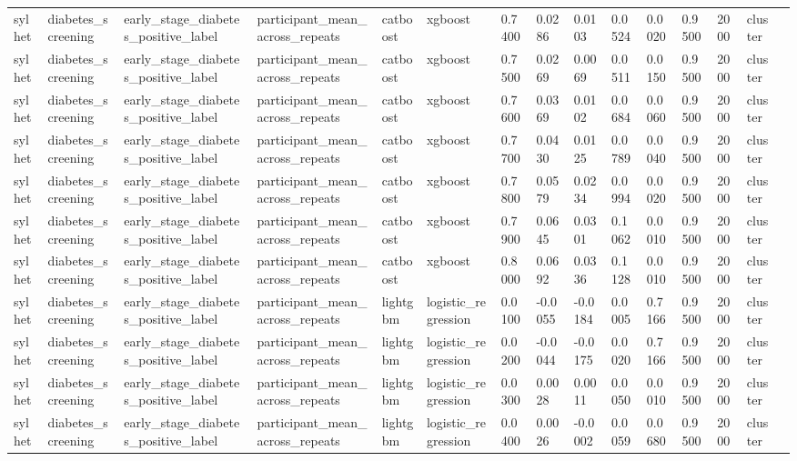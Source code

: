 \begin{tabular}{lllllllllllllll}
sylhet & diabetes\_screening & early\_stage\_diabetes\_positive\_label & participant\_mean\_across\_repeats & catboost & xgboost & 0.7400 & 0.0286 & 0.0103 & 0.0524 & 0.0020 & 0.9500 & 2000 & cluster &  \\
sylhet & diabetes\_screening & early\_stage\_diabetes\_positive\_label & participant\_mean\_across\_repeats & catboost & xgboost & 0.7500 & 0.0269 & 0.0069 & 0.0511 & 0.0150 & 0.9500 & 2000 & cluster &  \\
sylhet & diabetes\_screening & early\_stage\_diabetes\_positive\_label & participant\_mean\_across\_repeats & catboost & xgboost & 0.7600 & 0.0369 & 0.0102 & 0.0684 & 0.0060 & 0.9500 & 2000 & cluster &  \\
sylhet & diabetes\_screening & early\_stage\_diabetes\_positive\_label & participant\_mean\_across\_repeats & catboost & xgboost & 0.7700 & 0.0430 & 0.0125 & 0.0789 & 0.0040 & 0.9500 & 2000 & cluster &  \\
sylhet & diabetes\_screening & early\_stage\_diabetes\_positive\_label & participant\_mean\_across\_repeats & catboost & xgboost & 0.7800 & 0.0579 & 0.0234 & 0.0994 & 0.0020 & 0.9500 & 2000 & cluster &  \\
sylhet & diabetes\_screening & early\_stage\_diabetes\_positive\_label & participant\_mean\_across\_repeats & catboost & xgboost & 0.7900 & 0.0645 & 0.0301 & 0.1062 & 0.0010 & 0.9500 & 2000 & cluster &  \\
sylhet & diabetes\_screening & early\_stage\_diabetes\_positive\_label & participant\_mean\_across\_repeats & catboost & xgboost & 0.8000 & 0.0692 & 0.0336 & 0.1128 & 0.0010 & 0.9500 & 2000 & cluster &  \\
sylhet & diabetes\_screening & early\_stage\_diabetes\_positive\_label & participant\_mean\_across\_repeats & lightgbm & logistic\_regression & 0.0100 & -0.0055 & -0.0184 & 0.0005 & 0.7166 & 0.9500 & 2000 & cluster &  \\
sylhet & diabetes\_screening & early\_stage\_diabetes\_positive\_label & participant\_mean\_across\_repeats & lightgbm & logistic\_regression & 0.0200 & -0.0044 & -0.0175 & 0.0020 & 0.7166 & 0.9500 & 2000 & cluster &  \\
sylhet & diabetes\_screening & early\_stage\_diabetes\_positive\_label & participant\_mean\_across\_repeats & lightgbm & logistic\_regression & 0.0300 & 0.0028 & 0.0011 & 0.0050 & 0.0010 & 0.9500 & 2000 & cluster &  \\
sylhet & diabetes\_screening & early\_stage\_diabetes\_positive\_label & participant\_mean\_across\_repeats & lightgbm & logistic\_regression & 0.0400 & 0.0026 & -0.0002 & 0.0059 & 0.0680 & 0.9500 & 2000 & cluster &  \\

\end{tabular}
